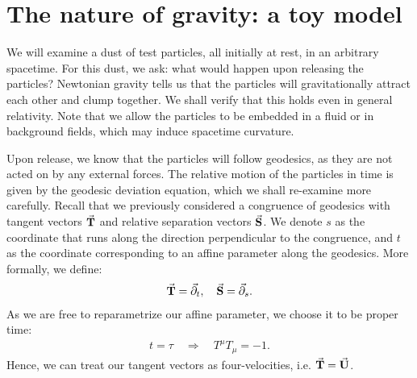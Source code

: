 \documentclass[10pt]{article}
\newcommand{\<}{\langle}
\renewcommand{\>}{\rangle}
\renewcommand{\(}{\left(}
\renewcommand{\)}{\right)}
\renewcommand{\[}{\left[}
\renewcommand{\]}{\right]}
\renewcommand{\d}{\partial}
\begin{document}
		\section{The nature of gravity: a toy model}
		We will examine a dust of test particles, all initially at rest, in an arbitrary spacetime. For this dust, we ask: what would happen upon releasing the particles? Newtonian gravity tells us that the particles will gravitationally attract each other and clump together. We shall verify that this holds even in general relativity. Note that we allow the particles to be embedded in a fluid or in background fields, which may induce spacetime curvature.
		
		Upon release, we know that the particles will follow geodesics, as they are not acted on by any external forces. The relative motion of the particles in time is given by the geodesic deviation equation, which we shall re-examine more carefully. Recall that we previously considered a congruence of geodesics with tangent vectors $\va{T}$ and relative separation vectors $\va{S}$. We denote $s$ as the coordinate that runs along the direction perpendicular to the congruence, and $t$ as the coordinate corresponding to an affine parameter along the geodesics. More formally, we define:
		\begin{align}
			\va{T} = \va{\d}_t, \quad \va{S} = \va{\d}_s.
		\end{align}
		As we are free to reparametrize our affine parameter, we choose it to be proper time:
		\begin{align}
			t=\tau \quad\Rightarrow\quad T^\mu T_\mu = -1.
		\end{align}
		Hence, we can treat our tangent vectors as four-velocities, i.e. $\va{T}=\va{U}$.
		
\end{document}

